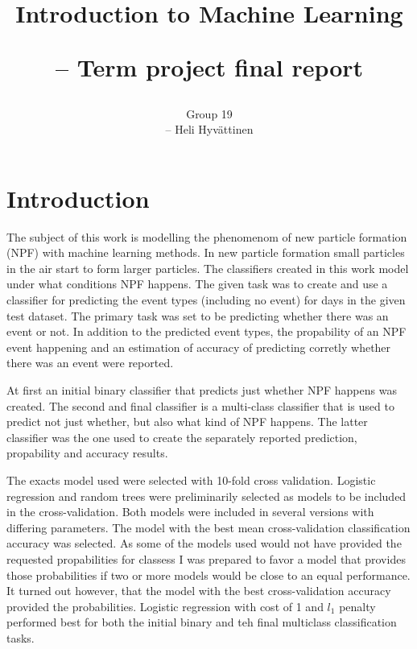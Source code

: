 \documentclass[a4size, 12pt]{report}
\begin{document}
	
	\author{Group 19 
		
		– Heli Hyvättinen}
	
	\title{Introduction to Machine Learning
		
		 – Term project final report }
	
	\maketitle
	

	
	\section*{Introduction}
	
	The subject of this work is modelling the phenomenom of new particle formation (NPF) with machine learning methods. In new particle formation small particles in the air start to form larger particles. The classifiers created in this work model under what conditions NPF happens. The given task was to create and use a classifier for predicting the event types (including no event) for days in the given test dataset. The primary task was set to be predicting whether there was an event or not. In addition to the predicted event types, the propability of an NPF event happening and an estimation of accuracy of predicting corretly whether there was an event were reported.     
	
	At first an initial binary classifier that predicts just whether NPF happens was created. The second and final classifier is a multi-class classifier that is used to predict not just whether, but also what kind of NPF happens.  The latter classifier was the one used to create the separately reported prediction, propability and accuracy results.
 
		The exacts model used were selected with 10-fold cross validation.  Logistic regression and random trees were preliminarily selected as models to be included in the cross-validation. Both models were included in several versions with differing parameters. The model with the best mean cross-validation classification accuracy was selected. As some of the models used would not have provided the requested propabilities for classess I was prepared to favor a model that provides those probabilities if two or more models would be close to an equal performance. It turned out however, that the model with the best cross-validation accuracy provided the probabilities. Logistic regression with cost of 1 and $l_1$ penalty performed best for both the initial binary and teh final multiclass classification tasks.   
\end{document}
